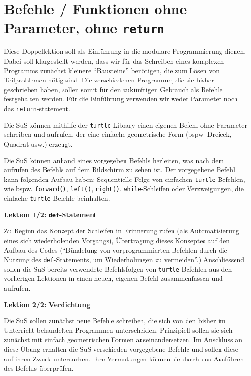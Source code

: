 \section{Befehle / Funktionen ohne Parameter, ohne \texorpdfstring{\lstinline|return|}{return}}
\begin{myExBox}
Diese Doppellektion soll als Einführung in die modulare Programmierung dienen. Dabei soll klargestellt werden, dass wir für das Schreiben eines komplexen Programms zunächst kleinere ``Bausteine'' benötigen, die zum Lösen von Teilproblemen nötig sind. Die verschiedenen Programme, die sie bisher geschrieben haben, sollen somit für den zukünftigen Gebrauch als Befehle festgehalten werden. Für die Einführung verwenden wir weder Parameter noch das \lstinline|return|-statement.

\begin{todolist}
    \item Die SuS können mithilfe der \lstinline|turtle|-Library einen eigenen Befehl ohne Parameter schreiben und aufrufen, der eine einfache geometrische Form (bspw. Dreieck, Quadrat usw.) erzeugt.
    \item Die SuS können anhand eines vorgegeben Befehls herleiten, was nach dem aufrufen des Befehls auf dem Bildschirm zu sehen ist. Der vorgegebene Befehl kann folgenden Aufbau haben: Sequentielle Folge von einfachen \lstinline|turtle|-Befehlen, wie bspw. \lstinline|forward()|, \lstinline|left()|, \lstinline|right()|. \lstinline|while|-Schleifen oder Verzweigungen, die einfache \lstinline|turtle|-Befehle beinhalten.
\end{todolist}

\textbf{Lektion 1/2:  \lstinline|def|-Statement}

Zu Beginn das Konzept der Schleifen in Erinnerung rufen (als Automatisierung eines sich wiederholenden Vorgangs), Übertragung dieses Konzeptes auf den Aufbau des Codes (``Bündelung von vorprogrammierten Befehlen durch die Nutzung des \lstinline|def|-Statements, um Wiederholungen zu vermeiden''.) Anschliessend sollen die SuS bereits verwendete Befehlsfolgen von \lstinline|turtle|-Befehlen aus den vorherigen Lektionen in einen neuen, eigenen Befehl zusammenfassen und aufrufen. 

\textbf{Lektion 2/2: Verdichtung}

Die SuS sollen zunächst neue Befehle schreiben, die sich von den bisher im Unterricht behandelten Programmen unterscheiden. Prinzipiell sollen sie sich zunächst mit einfach geometrischen Formen auseinandersetzen. Im Anschluss an diese Übung erhalten die SuS verschieden vorgegebene Befehle und sollen diese auf ihren Zweck untersuchen. Ihre Vermutungen können sie durch das Ausführen des Befehls überprüfen.


\end{myExBox}
